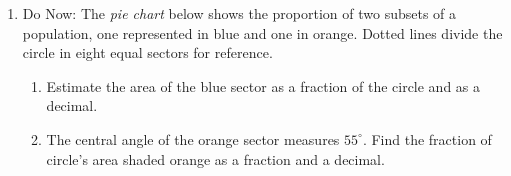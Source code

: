 \documentclass[12pt, twoside]{article}
\begin{document}
\begin{enumerate}
\newpage
\item Do Now: The \emph{pie chart} below shows the proportion of two subsets of a population, one represented in blue and one in orange. Dotted lines divide the circle in eight equal sectors for reference.
  \begin{multicols}{2}
  \raggedcolumns
  \begin{enumerate}[itemsep=1.5cm]
    \item Estimate the area of the blue sector as a fraction of the circle and as a decimal.
    \item The central angle of the orange sector measures $55^\circ$. Find the fraction of circle's area shaded orange as a fraction and a decimal.
  \end{enumerate}
  \end{multicols}


\end{enumerate}
\end{document}
